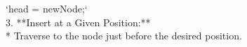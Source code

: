 \documentclass[preview]{standalone}
\begin{document}
`head = newNode;`\\3.  **Insert at a Given Position:**\\*   Traverse to the node just before the desired position.\\
\end{document}
